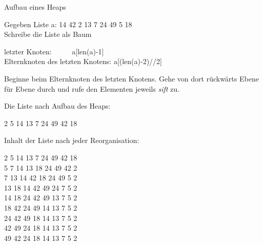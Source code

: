 \documentclass{beamer}
\begin{document}
\begin{frame}[fragile]
Aufbau eines Heaps  

Gegeben Liste a:  14 42 2 13 7 24 49 5 18 \\
Schreibe die Liste als Baum  

 \pause 


letzter Knoten: ~~~~~\pause a[len(a)-1] \\ \pause 
Elternknoten des letzten Knotens: \pause a[(len(a)-2)//2] \pause 

Beginne beim Elternknoten des letzten Knotens. Gehe von dort rückwärts Ebene für Ebene durch und rufe den Elementen jeweils \textit{sift} zu.
\end{frame}

\begin{frame}[fragile]


Die Liste nach Aufbau des Heaps:

2 5 14 13 7 24 49 42 18
\end{frame}

 
\begin{frame}[fragile]
Inhalt der Liste nach jeder Reorganisation:

2 5 14 13 7 24 49 42 18 \\
5 7 14 13 18 24 49 42 \alert{2} \\
7 13 14 42 18 24 49 \alert{5 2} \\
13 18 14 42 49 24  \alert{7 5 2} \\
14 18 24 42 49 \alert{13 7 5 2 \\}
18 42 24 49 \alert{14 13 7 5 2 \\}
24 42 49 \alert{18 14 13 7 5 2 \\}
42 49 \alert{24 18 14 13 7 5 2 \\}
49 \alert{42 24 18 14 13 7 5 2 \\}

\end{frame}
\end{document}
